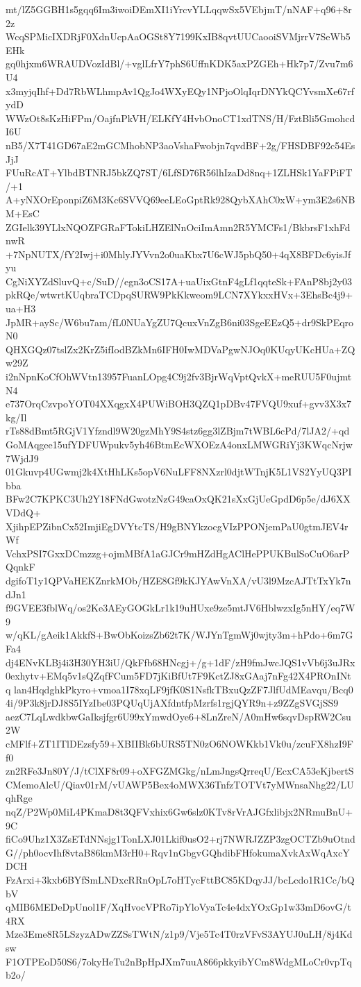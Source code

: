 mt/lZ5GGBH1s5gqq6Im3iwoiDEmXI1iYrcvYLLqqwSx5VEbjmT/nNAF+q96+8r2z
WcqSPMicIXDRjF0XdnUcpAaOGSt8Y7199KxIB8qvtUUCaooiSVMjrrV7SeWb5EHk
gq0hjxm6WRAUDVozIdBl/+vglLfrY7phS6UffnKDK5axPZGEh+Hk7p7/Zvu7m6U4
x3myjqIhf+Dd7RbWLhmpAv1QgJo4WXyEQy1NPjoOlqIqrDNYkQCYvsmXe67rfydD
WWzOt8sKzHiFPm/OajfnPkVH/ELKfY4HvbOnoCT1xdTNS/H/FztBli5GmohcdI6U
nB5/X7T41GD67aE2mGCMhobNP3aoVshaFwobjn7qvdBF+2g/FHSDBF92c54EsJjJ
FUuRcAT+YlbdBTNRJ5bkZQ7ST/6LfSD76R56lhIzaDd8nq+1ZLHSk1YaFPiFT/+1
A+yNXOrEponpiZ6M3Kc6SVVQ69eeLEoGptRk928QybXAhC0xW+ym3E2s6NBM+EsC
ZGIelk39YLlxNQOZFGRaFTokiLHZElNnOciImAmn2R5YMCFs1/BkbrsF1xhFdnwR
+7NpNUTX/fY2Iwj+i0MhlyJYVvn2o0uaKbx7U6cWJ5pbQ50+4qX8BFDc6yisJfyu
CgNiXYZdSluvQ+c/SuD//egn3oCS17A+uaUixGtnF4gLf1qqteSk+FAnP8bj2y03
pkRQe/wtwrtKUqbraTCDpqSURW9PkKkweom9LCN7XYkxxHVx+3EhsBc4j9+ua+H3
JpMR+aySc/W6bu7am/fL0NUaYgZU7QcuxVnZgB6ni03SgeEEzQ5+dr9SkPEqroN0
QHXGQz07tslZx2KrZ5ifIodBZkMn6IFH0IwMDVaPgwNJOq0KUqyUKcHUa+ZQw29Z
i2nNpnKoCfOhWVtn13957FuanLOpg4C9j2fv3BjrWqVptQvkX+meRUU5F0ujmtN4
e737OrqCzvpoYOT04XXqgxX4PUWiBOH3QZQ1pDBv47FVQU9xuf+gvv3X3x7kg/Il
rTs88dBmt5RGjV1Yfzndl9W20gzMhY9S4stz6gg3lZBjm7tWBL6cPd/7lJA2/+qd
GoMAqgee15ufYDFUWpukv5yh46BtmEcWXOEzA4onxLMWGRiYj3KWqcNrjw7WjdJ9
01Gkuvp4UGwmj2k4XtHhLKs5opV6NuLFF8NXzrl0djtWTnjK5L1VS2YyUQ3PIbba
BFw2C7KPKC3Uh2Y18FNdGwotzNzG49caOxQK21sXxGjUeGpdD6p5e/dJ6XXVDdQ+
XjihpEPZibnCx52ImjiEgDVYtcTS/H9gBNYkzocgVIzPPONjemPaU0gtmJEV4rWf
VchxPSI7GxxDCmzzg+ojmMBfA1aGJCr9mHZdHgAClHePPUKBulSoCuO6arPQqnkF
dgifoT1y1QPVaHEKZnrkMOb/HZE8Gf9kKJYAwVnXA/vU3l9MzcAJTtTxYk7ndJn1
f9GVEE3fblWq/os2Ke3AEyGOGkLr1k19uHUxe9ze5mtJV6HblwzxIg5nHY/eq7W9
w/qKL/gAeik1AkkfS+BwObKoizsZb62t7K/WJYnTgmWj0wjty3m+hPdo+6m7GFa4
dj4ENvKLBj4i3H30YH3iU/QkFfb68HNcgj+/g+1dF/zH9fmJwcJQS1vVb6j3uJRx
0exhytv+EMq5v1sQZqfFCum5FD7jKiBfUt7F9KctZJ8xGAaj7nFg42X4PROnINtq
lan4HqdghkPkyro+vmoa1I78xqLF9jfK0S1NsfkTBxuQzZF7JlfUdMEavqu/Bcq0
4i/9P3k8jrDJ8S5IYzIbe03PQUqUjAXfdntfpMzrfs1rgjQYR9n+z9ZZgSVGjSS9
aezC7LqLwdkbwGaIksjfgr6U99xYmwdOye6+8LnZreN/A0mHw6sqvDspRW2Csu2W
cMFlf+ZT1ITlDEzsfy59+XBIIBk6bURS5TN0zO6NOWKkb1Vk0u/zcuFX8hzI9Ff0
zn2RFe3Jn80Y/J/tClXF8r09+oXFGZMGkg/nLmJngsQrreqU/EcxCA53eKjbertS
CMemoAlcU/Qiav01rM/vUAWP5Bex4oMWX36TnfzTOTVt7yMWnsaNhg22/LUqhRge
nqZ/P2Wp0MiL4PKmaD8t3QFVxhix6Gw6slz0KTv8rVrAJGfxlibjx2NRmuBnU+9C
fiCo9Uhz1X3ZsETdNNsjg1TonLXJ01Lkif0usO2+rj7NWRJZZP3zgOCTZb9uOtnd
G//ph0ocvIhf8vtaB86kmM3rH0+Rqv1nGbgvGQhdibFHfokumaXvkAxWqAxcYDCH
FzArxi+3kxb6BYfSmLNDxcRRnOpL7oHTycFttBC85KDqyJJ/bcLcdo1R1Cc/bQbV
qMIB6MEDeDpUnol1F/XqHvocVPRo7ipYloVyaTc4e4dxYOxGp1w33mD6ovG/t4RX
Mze3Eme8R5LSzyzADwZZSsTWtN/z1p9/Vje5Tc4T0rzVFvS3AYUJ0uLH/8j4Kdsw
F1OTPEoD50S6/7okyHeTu2nBpHpJXm7uuA866pkkyibYCm8WdgMLoCr0vpTqb2o/
